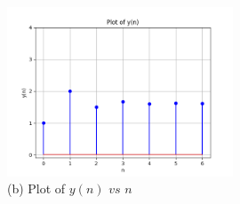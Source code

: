 \documentclass[journal,12pt,twocolumn]{IEEEtran}
\theoremstyle{remark}
\begin{document}
	\begin{figure}[htbp]
		\centering
		\includegraphics[width=0.6\textwidth]{ncert-maths/11/9/1/14/figures/fig2.png}
		\caption*{\hspace{2cm} (b) Plot of $y(n)$ $vs$ $n$}
		
	\end{figure}
	
	
\end{document}
